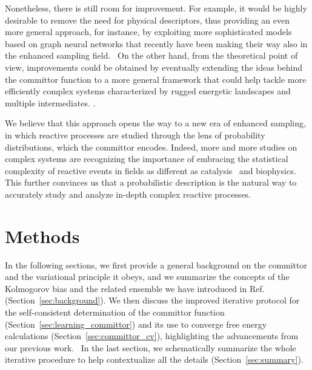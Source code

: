    Nonetheless, there is still room for improvement.
    For example, it would be highly desirable to remove the need for physical descriptors, thus providing an even more general approach, for instance, by exploiting more sophisticated models based on graph neural networks that recently have been making their way also in the enhanced sampling field.~\cite{zhang2024descriptorsfree, dietrich2024graph, zou2024graph}
    On the other hand, from the theoretical point of view, improvements could be obtained by eventually extending the ideas behind the committor function to a more general framework that could help tackle more efficiently complex systems characterized by rugged energetic landscapes and multiple intermediates.
    .\cite{weinan2010transition}

    We believe that this approach opens the way to a new era of enhanced sampling, in which reactive processes are studied through the lens of probability distributions, which the committor encodes.
    Indeed, more and more studies on complex systems are recognizing the importance of embracing the statistical complexity of reactive events in fields as different as catalysis~\cite{wang2015dynamic, wang2016oxidation, yang2023reactant, tian2023dynamically, perego2024dynamics, tripathi2024poisoning} and biophysics.~\cite{lindorff2011fast, dill2012folding, sztain2021glycan}
    This further convinces us that a probabilistic description is the natural way to accurately study and analyze in-depth complex reactive processes.

\section{Methods}  
\label{sec:methods}
    In the following sections, we first provide a general background on the committor and the variational principle it obeys, and we summarize the concepts of the Kolmogorov bias and the related ensemble we have introduced in Ref.  (Section~\ref{sec:background}).
    We then discuss the improved iterative protocol for the self-consistent determination of the committor function  (Section~\ref{sec:learning_committor}) and its use to converge free energy calculations  (Section~\ref{sec:committor_cv}), highlighting the advancements from our previous work.~\cite{kang2024computing}
    In the last section, we schematically summarize the whole iterative procedure to help contextualize all the details  (Section~\ref{sec:summary}).
    
